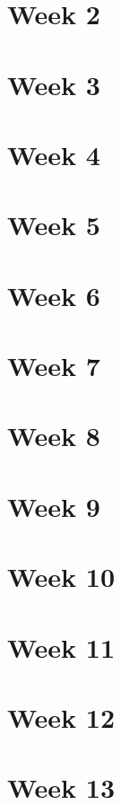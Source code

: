 \documentclass{article}
\begin{document}
    \section{Week 2}

    \section{Week 3}

    \section{Week 4}

    \section{Week 5}

    \section{Week 6}

    \section{Week 7}

    \section{Week 8}

    \section{Week 9}

    \section{Week 10}

    \section{Week 11}

    \section{Week 12}

    \section{Week 13}
\end{document}
